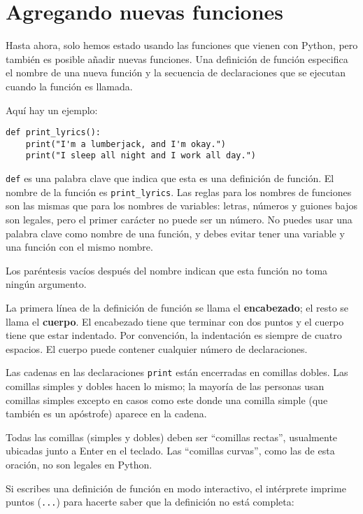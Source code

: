 \documentclass[12pt,letterpaper]{book}
\begin{document}
\section{Agregando nuevas funciones}

Hasta ahora, solo hemos estado usando las funciones que vienen con Python, pero también es posible añadir nuevas funciones. Una definición de función especifica el nombre de una nueva función y la secuencia de declaraciones que se ejecutan cuando la función es llamada.

Aquí hay un ejemplo:

\begin{lstlisting}
def print_lyrics():
    print("I'm a lumberjack, and I'm okay.")
    print("I sleep all night and I work all day.")
\end{lstlisting}

\texttt{def} es una palabra clave que indica que esta es una definición de función. El nombre de la función es \texttt{print\_lyrics}. Las reglas para los nombres de funciones son las mismas que para los nombres de variables: letras, números y guiones bajos son legales, pero el primer carácter no puede ser un número. No puedes usar una palabra clave como nombre de una función, y debes evitar tener una variable y una función con el mismo nombre.

Los paréntesis vacíos después del nombre indican que esta función no toma ningún argumento.

La primera línea de la definición de función se llama el \textbf{encabezado}; el resto se llama el \textbf{cuerpo}. El encabezado tiene que terminar con dos puntos y el cuerpo tiene que estar indentado. Por convención, la indentación es siempre de cuatro espacios. El cuerpo puede contener cualquier número de declaraciones.

Las cadenas en las declaraciones \texttt{print} están encerradas en comillas dobles. Las comillas simples y dobles hacen lo mismo; la mayoría de las personas usan comillas simples excepto en casos como este donde una comilla simple (que también es un apóstrofe) aparece en la cadena.

Todas las comillas (simples y dobles) deben ser ``comillas rectas'', usualmente ubicadas junto a Enter en el teclado. Las ``comillas curvas'', como las de esta oración, no son legales en Python.

Si escribes una definición de función en modo interactivo, el intérprete imprime puntos (\texttt{...}) para hacerte saber que la definición no está completa:
\end{document}
